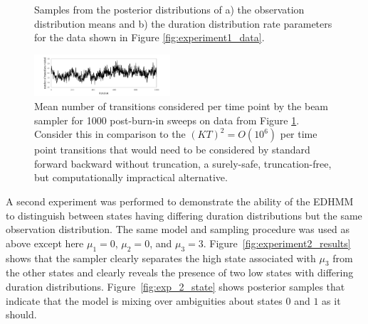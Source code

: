 \begin{figure}
    \caption{Samples from the posterior distributions of a) the observation distribution means and b) the duration distribution rate parameters for the data shown in Figure \ref{fig:experiment1_data}.}
    \label{fig:experiment1_results}
\end{figure}

\begin{figure}
    \includegraphics[width=0.45\textwidth]{../pic/number_transitions_visited.pdf}

\caption{Mean number of transitions considered per time point by the beam sampler for 1000 post-burn-in sweeps on data from Figure \ref{fig:experiment1_results}. Consider this in comparison to the $(KT)^2 = O(10^6)$ per time point transitions that would need to be considered by standard forward backward without truncation, a surely-safe, truncation-free, but computationally impractical alternative.}
\label{fig:allowed}
\end{figure}

A second experiment was performed to demonstrate the ability of the EDHMM to distinguish between states having differing duration distributions but the same observation distribution. The same model and sampling procedure was used as above except here $\mu_1 = 0$, $\mu_2 = 0$, and $\mu_3 = 3$.
Figure~\ref{fig:experiment2_results} shows that the sampler clearly separates the high state associated with $\mu_3$ from the other states and clearly 
reveals the presence of
two  low states with differing duration distributions. Figure~\ref{fig:exp_2_state} shows posterior samples that indicate that the model is mixing over ambiguities about states $0$ and $1$ as it should. %

